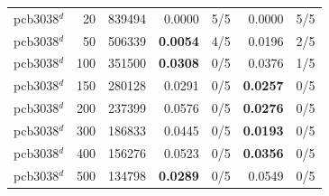 \begin{tabular}{lrrrrrr}
pcb3038$^{d}$ & 20 & 839494 & 0.0000 & 5/5 & 0.0000 & 5/5 \\
pcb3038$^{d}$ & 50 & 506339 & \textbf{0.0054} & 4/5 & 0.0196 & 2/5 \\
pcb3038$^{d}$ & 100 & 351500 & \textbf{0.0308} & 0/5 & 0.0376 & 1/5 \\
pcb3038$^{d}$ & 150 & 280128 & 0.0291 & 0/5 & \textbf{0.0257} & 0/5 \\
pcb3038$^{d}$ & 200 & 237399 & 0.0576 & 0/5 & \textbf{0.0276} & 0/5 \\
pcb3038$^{d}$ & 300 & 186833 & 0.0445 & 0/5 & \textbf{0.0193} & 0/5 \\
pcb3038$^{d}$ & 400 & 156276 & 0.0523 & 0/5 & \textbf{0.0356} & 0/5 \\
pcb3038$^{d}$ & 500 & 134798 & \textbf{0.0289} & 0/5 & 0.0549 & 0/5 \\
\bottomrule
\end{tabular}
